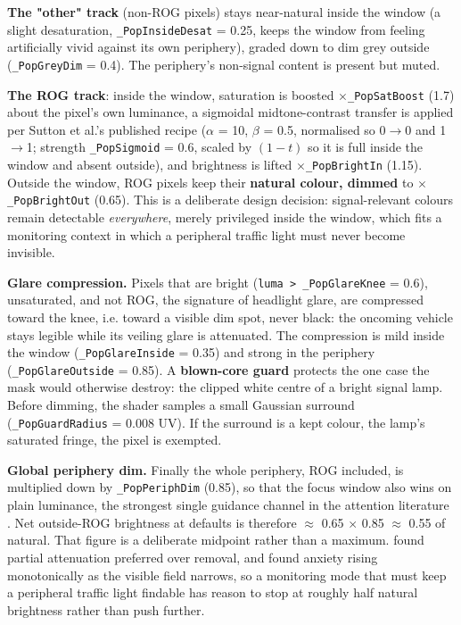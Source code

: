 \textbf{The "other" track} (non-ROG pixels) stays near-natural inside the window (a slight desaturation,
\verb|_PopInsideDesat| = 0.25, keeps the window from feeling artificially vivid against its own
periphery), graded down to dim grey outside (\verb|_PopGreyDim| = 0.4). The periphery's non-signal
content is present but muted.

\textbf{The ROG track}: inside the window, saturation is boosted $\times$\verb|_PopSatBoost| (1.7) about the pixel's
own luminance, a sigmoidal midtone-contrast transfer is applied per Sutton et al.'s published recipe
($\alpha$ = 10, $\beta$ = 0.5, normalised so 0$\rightarrow$0 and 1$\rightarrow$1; strength \verb|_PopSigmoid| = 0.6, scaled by $(1-t)$ so it is
full inside the window and absent outside), and brightness is lifted $\times$\verb|_PopBrightIn| (1.15).
Outside the window, ROG pixels keep their \textbf{natural colour, dimmed} to $\times$\verb|_PopBrightOut| (0.65).
This is a deliberate design decision: signal-relevant colours remain detectable \textit{everywhere}, merely
privileged inside the window, which fits a monitoring context in which a peripheral traffic light
must never become invisible.

\textbf{Glare compression.} Pixels that are bright (\verb|luma > _PopGlareKnee| = 0.6), unsaturated, and not
ROG, the signature of headlight glare, are compressed toward the knee, i.e. toward a visible dim
spot, never black: the oncoming vehicle stays legible while its veiling glare is attenuated. The
compression is mild inside the window (\verb|_PopGlareInside| = 0.35) and strong in the periphery
(\verb|_PopGlareOutside| = 0.85). A \textbf{blown-core guard} protects the one case the mask would otherwise
destroy: the clipped white centre of a bright signal lamp. Before dimming, the shader samples a small
Gaussian surround (\verb|_PopGuardRadius| = 0.008 UV). If the surround is a kept colour, the lamp's
saturated fringe, the pixel is exempted.

\textbf{Global periphery dim.} Finally the whole periphery, ROG included, is multiplied down by
\verb|_PopPeriphDim| (0.85), so that the focus window also wins on plain luminance, the strongest single
guidance channel in the attention literature \citep{bailey2009,grogorick2017}. Net
outside-ROG brightness at defaults is therefore $\approx$ 0.65 $\times$ 0.85 $\approx$ 0.55 of natural.
That figure is a deliberate midpoint rather than a maximum. \citet{cheng2022} found partial
attenuation preferred over removal, and \citet{barhorstcates2016} found anxiety
rising monotonically as the visible field narrows, so a monitoring mode that must keep a peripheral
traffic light findable has reason to stop at roughly half natural brightness rather than push
further.

